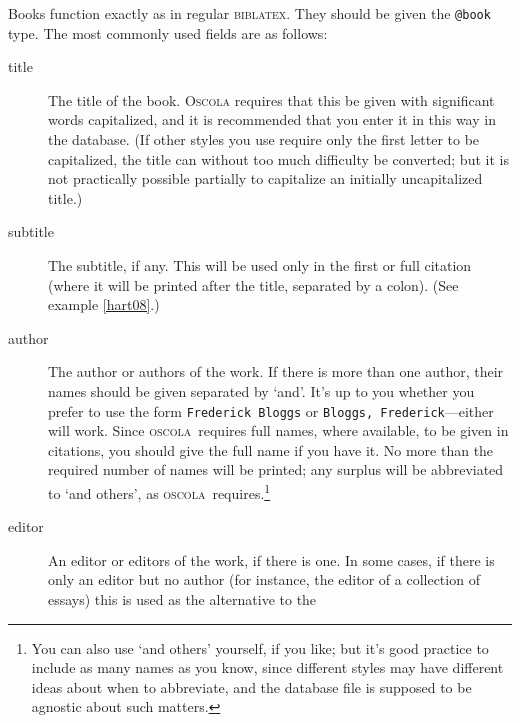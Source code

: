 \documentclass[a4paper,
               11pt,
	       DIV=1,			   
	       footinclude=false]
	      {scrartcl}
\newcommand{\biblatex}{\textsc{biblatex}}
\newcommand{\oscolashort}{\textsc{oscola}\nocite{oscola}}
\begin{document}
Books function exactly as in regular \biblatex. They should be given
the \texttt{@book} type. The most commonly used fields are as follows:
\begin{description}
\item[title] 
  The title of the book. \textsc{Oscola} requires that this
  be given with significant words capitalized, and it is recommended
  that you enter it in this way in the database. (If other styles you
  use require only the first letter to be capitalized, the title can
  without too much difficulty be converted; but it is not practically
  possible partially to capitalize an initially uncapitalized title.)
\item[subtitle]
  The subtitle, if any. This will be used only in the
  first or full citation (where it will be printed after the title,
  separated by a colon). (See example \ref{hart08}.)
\item[author]
  The author or authors of the work. If there is more than
  one author, their names should be given separated by `and'. It's up
  to you whether you prefer to use the form \texttt{Frederick Bloggs}
  or \texttt{Bloggs, Frederick}---either will work. Since
  \oscolashort\ requires full names, where available, to be given in
  citations, you should give the full name if you have it. No more than the required number of names will be printed;
  any surplus will be abbreviated to `and others', as
  \oscolashort\ requires.\footnote{You can also use `and others'
    yourself, if you like; but it's good practice to include as many
    names as you know, since different styles may have different ideas
    about when to abbreviate, and the database file is supposed to be
    agnostic about such matters.}
\item[editor]
  An editor or editors of the work, if there is one. In some cases,
  if there is only an editor but no author (for instance, the editor
  of a collection of essays) this is used as the alternative to the

\end{description}
\end{document}
